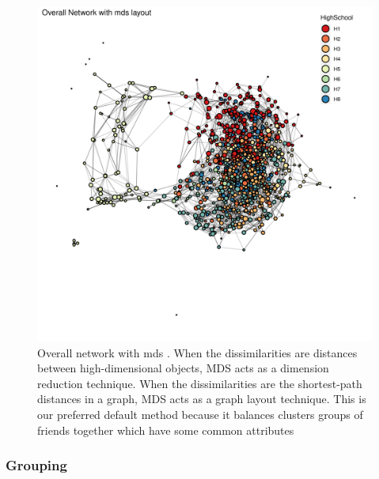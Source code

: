     \begin{figure}[h!]
        \centering
            \includegraphics[width=0.7\linewidth]{figures/Networks/Layouts/Graph_OverallNetwork_with_no_highlight_mds_HighSchool___mds.png} 
        \caption{Overall network with \gls{mds} \cite{Buja2008}. When the dissimilarities are distances between high-dimensional objects, MDS acts as a dimension reduction technique. When the dissimilarities are the shortest-path distances in a graph, MDS acts as a graph layout technique. This is our preferred default method because it balances clusters groups of friends together which have some common attributes}
        \label{figure:networksLayoutsMDS}
    \end{figure}    


    \newpage

\subsubsection{Grouping}

